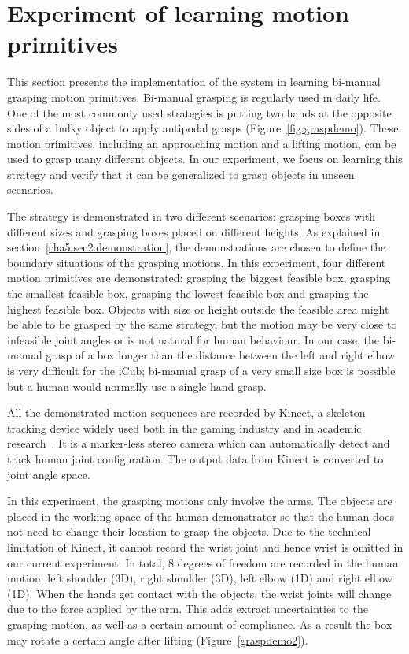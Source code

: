 \section{Experiment of learning motion primitives}
\label{cha5:sec3}




This section presents the implementation of the system in learning bi-manual grasping motion primitives. Bi-manual grasping is regularly used in daily life. One of the most commonly used strategies is putting two hands at the opposite sides of a bulky object to apply antipodal grasps (Figure~\ref{fig:graspdemo}). These motion primitives, including an approaching motion and a lifting motion, can be used to grasp many different objects. In our experiment, we focus on learning this strategy and verify that it can be generalized to grasp objects in unseen scenarios.

The strategy is demonstrated in two different scenarios: grasping boxes with different sizes and grasping boxes placed on different heights. As explained in section~\ref{cha5:sec2:demonstration}, the demonstrations are chosen to define the boundary situations of the grasping motions. In this experiment, four different motion primitives are demonstrated: grasping the biggest feasible box,  grasping the smallest feasible box, grasping the lowest feasible box and grasping the highest feasible box. Objects with size or height outside the feasible area might be able to be grasped by the same strategy, but the motion may be very close to infeasible joint angles or is not natural for human behaviour. In our case, the bi-manual grasp of a box longer than the distance between the left and right elbow is very difficult for the iCub; bi-manual grasp of a very small size box is possible but a human would normally use a single hand grasp.

All the demonstrated motion sequences are recorded by Kinect, a skeleton tracking device widely used both in the gaming industry and in academic research~\citep{ren20123d}. It is a marker-less stereo camera which can automatically detect and track human joint configuration. The output data from Kinect is converted to joint angle space.

In this experiment, the grasping motions only involve the arms. The objects are placed in the working space of the human demonstrator so that the human does not need to change their location to grasp the objects. Due to the technical limitation of Kinect, it cannot record the wrist joint and hence wrist is omitted in our current experiment. In total, 8 degrees of freedom are recorded in the human motion: left shoulder (3D), right shoulder (3D), left elbow (1D) and right elbow (1D). When the hands get contact with the objects, the wrist joints will change due to the force applied by the arm. This adds extract uncertainties to the grasping motion, as well as a certain amount of compliance. As a result the box may rotate a certain angle after lifting (Figure~\ref{graspdemo2}).


